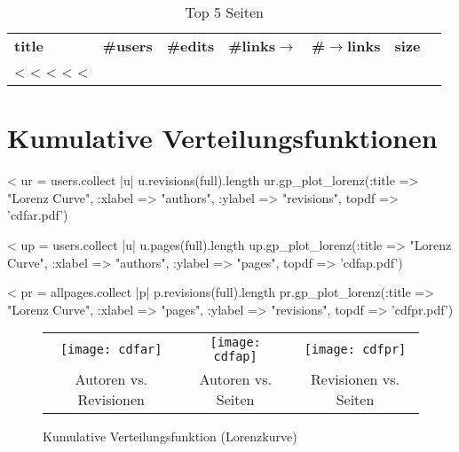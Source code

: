 \documentclass{scrartcl}
\begin{document}
\begin{table}
  \centering\small 
  \caption{Top 5 Seiten}
	\label{tab:top-5-pages}
  \begin{tabularx}{\linewidth}{Xrrrrrr}\toprule
    \textbf{title} & \textbf{\#users} &\textbf{\#edits} 
    &\textbf{\#links$\rightarrow$} &\textbf{\#$\rightarrow$links}
    &\textbf{size}\\
    <%
    <%
    <%
    <%
    <%
    \bottomrule
  \end{tabularx}
\end{table}




\section{Kumulative Verteilungsfunktionen} %
\label{sec:cumulative_distribution_functions}

<%
ur = users.collect { |u| u.revisions(full).length }
ur.gp_plot_lorenz(:title => "Lorenz Curve", :xlabel => "authors", :ylabel => "revisions", topdf => 'cdfar.pdf')

<%
up = users.collect { |u| u.pages(full).length }
up.gp_plot_lorenz(:title => "Lorenz Curve", :xlabel => "authors", :ylabel => "pages", topdf => 'cdfap.pdf')

<%
pr = allpages.collect { |p| p.revisions(full).length }
pr.gp_plot_lorenz(:title => "Lorenz Curve", :xlabel => "pages", :ylabel => "revisions", topdf => 'cdfpr.pdf')

\begin{figure}
  \centering
  \begin{tabular}{@{}ccc@{}}
    \texttt{[image: cdfar]} &
    \texttt{[image: cdfap]} &
    \texttt{[image: cdfpr]}\\
    Autoren vs. Revisionen &
    Autoren vs. Seiten &
    Revisionen vs. Seiten
  \end{tabular}
  \caption{Kumulative Verteilungsfunktion (Lorenzkurve)}
  \label{fig:cumulative_distribution_functions}
\end{figure}
\end{document}
